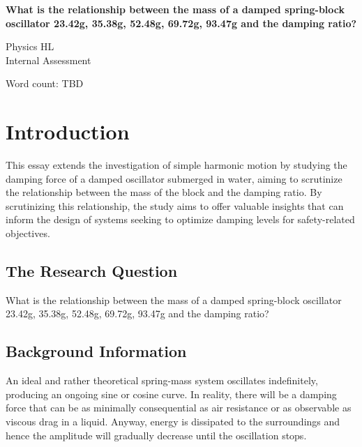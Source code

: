 \documentclass[a4paper,12pt]{article}
\begin{document}
\setlength{\belowcaptionskip}{-10pt}


\pagestyle{fancy}


\begin{titlepage}
  \begin{center}
    \vspace*{3cm}

    {\textbf{\Large{What is the relationship between the mass of a damped spring-block oscillator {23.42g, 35.38g, 52.48g, 69.72g, 93.47g} and the damping ratio?}}}

    \vspace{1cm}
    \large{Physics HL}\\
    \large{Internal Assessment}


    \vfill

    \vspace{1.5cm}

    Word count: TBD

  \end{center}
\end{titlepage}
\pagebreak
\tableofcontents
\pagebreak

\clearpage
\setcounter{page}{1}

\section{Introduction}
This essay extends the investigation of simple harmonic motion by studying the damping force of a damped oscillator submerged in water, aiming to scrutinize the relationship between the mass of the block and the damping ratio. By scrutinizing this relationship, the study aims to offer valuable insights that can inform the design of systems seeking to optimize damping levels for safety-related objectives.


\subsection{The Research Question}
What is the relationship between the mass of a damped spring-block oscillator {23.42g, 35.38g, 52.48g, 69.72g, 93.47g} and the damping ratio?

\subsection{Background Information}
An ideal and rather theoretical spring-mass system oscillates indefinitely, producing an ongoing sine or cosine curve. In reality, there will be a damping force that can be as minimally consequential as air resistance or as observable as viscous drag in a liquid. Anyway, energy is dissipated to the surroundings and hence the amplitude will gradually decrease until the oscillation stops.
\end{document}
